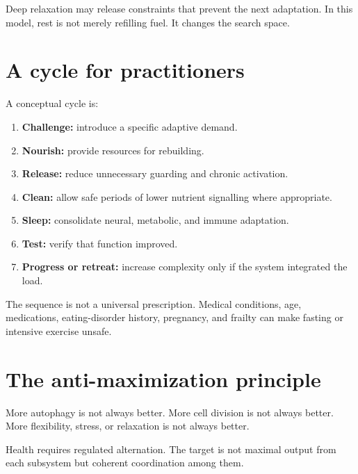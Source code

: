 Deep relaxation may release constraints that prevent the next adaptation. In this model, rest is not merely refilling fuel. It changes the search space.

\section{A cycle for practitioners}

A conceptual cycle is:

\begin{enumerate}
\def\labelenumi{\arabic{enumi}.}
\tightlist
\item
  \textbf{Challenge:} introduce a specific adaptive demand.
\item
  \textbf{Nourish:} provide resources for rebuilding.
\item
  \textbf{Release:} reduce unnecessary guarding and chronic activation.
\item
  \textbf{Clean:} allow safe periods of lower nutrient signalling where appropriate.
\item
  \textbf{Sleep:} consolidate neural, metabolic, and immune adaptation.
\item
  \textbf{Test:} verify that function improved.
\item
  \textbf{Progress or retreat:} increase complexity only if the system integrated the load.
\end{enumerate}

The sequence is not a universal prescription. Medical conditions, age, medications, eating-disorder history, pregnancy, and frailty can make fasting or intensive exercise unsafe.

\section{The anti-maximization principle}

More autophagy is not always better. More cell division is not always better. More flexibility, stress, or relaxation is not always better.

Health requires regulated alternation. The target is not maximal output from each subsystem but coherent coordination among them.
